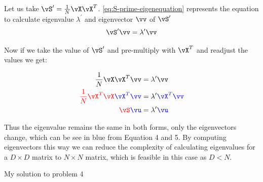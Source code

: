 \documentclass[a4paper,11pt]{article}
\begin{document}
\begin{mlsolution}

Let us take $\vS^{\prime}=\frac{1}{N}\vX\vX^T$. \ref{eq:S-prime-eigenequation} represents the equation to calculate eigenvalue $\lambda^{\prime}$ and eigenvector $\vv$ of $\vS^{\prime}$
\begin{equation}
    \vS^{\prime} \vv = \lambda^{\prime} \vv
    \label{eq:S-prime-eigenequation}
\end{equation}

Now if we take the value of $\vS^{\prime}$ and pre-multiply with $\vX^T$ and readjust the values we get:

\begin{align}
    \frac{1}{N}\vX\vX^T\vv &= \lambda^{\prime} \vv \\
    \red{\frac{1}{N}\vX^T\vX}\blue{\vX^T\vv} &= \lambda^{\prime} \blue{\vX^T \vv} \\
    \red{\vS} \blue{\vu} &= \lambda^{\prime} \blue{\vu}
\end{align}

Thus the eigenvalue remains the same in both forms, only the eigenvectors change, which can be see in blue from Equation 4 and 5. By computing eigenvectors this way we can reduce the complexity of calculating eigenvalues for a $D\times D$ matrix to $N\times N$ matrix, which is feasible in this case as $D<N$.

\end{mlsolution}

\begin{mlsolution}

My solution to problem 4

\end{mlsolution}
	
\end{document}

